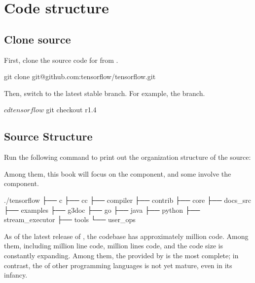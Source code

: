 \section{Code structure}
\begin{content}


\subsection{Clone source}
First, clone the source code for \tf{} from .
\begin{leftbar}
\begin{python}
git clone git@github.com:tensorflow/tensorflow.git
\end{python}
\end{leftbar}

Then, switch to the latest stable branch. For example, the  branch.
\begin{leftbar}
\begin{python}
$ cd tensorflow
$ git checkout r1.4
\end{python}%
\end{leftbar}


\subsection{Source Structure}
Run the following command to print out the organization structure of the \tf{} source:
\begin{leftbar}
\end{leftbar}

Among them, this book will focus on the  component, and some involve the  component.

\begin{leftbar}
\begin{c++}[caption={TensorFlowSource Structure}]
./tensorflow
├── c
├── cc
├── compiler
├── contrib
├── core
├── docs_src
├── examples
├── g3doc
├── go
├── java
├── python
├── stream_executor
├── tools
└── user_ops
\end{c++}
\end{leftbar}

As of the latest release of , the \tf{} codebase has approximately  million code. Among them, including  million line  code,  million lines code, and the code size is constantly expanding. Among them, the  provided by  is the most complete; in contrast, the  of other programming languages ​​is not yet mature, even in its infancy.


\end{content}
